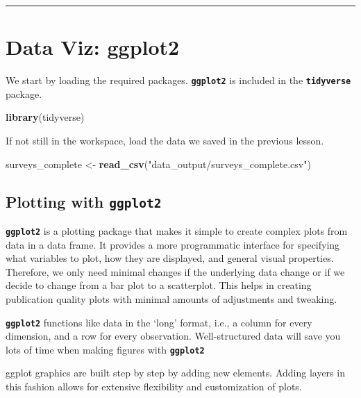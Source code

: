 \documentclass[]{book}
\newenvironment{Shaded}{\begin{snugshade}}{\end{snugshade}}
\newcommand{\KeywordTok}[1]{\textcolor[rgb]{0.13,0.29,0.53}{\textbf{#1}}}
\newcommand{\StringTok}[1]{\textcolor[rgb]{0.31,0.60,0.02}{#1}}
\newcommand{\NormalTok}[1]{#1}
\begin{document}
\begin{center}\rule{0.5\linewidth}{\linethickness}\end{center}

\chapter{Data Viz: ggplot2}\label{data-viz-ggplot2}

We start by loading the required packages. \textbf{\texttt{ggplot2}} is
included in the \textbf{\texttt{tidyverse}} package.

\begin{Shaded}
\begin{Highlighting}[]
\KeywordTok{library}\NormalTok{(tidyverse)}
\end{Highlighting}
\end{Shaded}

If not still in the workspace, load the data we saved in the previous
lesson.

\begin{Shaded}
\begin{Highlighting}[]
\NormalTok{surveys_complete <-}\StringTok{ }\KeywordTok{read_csv}\NormalTok{(}\StringTok{"data_output/surveys_complete.csv"}\NormalTok{)}
\end{Highlighting}
\end{Shaded}

\section{\texorpdfstring{Plotting with
\textbf{\texttt{ggplot2}}}{Plotting with ggplot2}}\label{plotting-with-ggplot2}

\textbf{\texttt{ggplot2}} is a plotting package that makes it simple to
create complex plots from data in a data frame. It provides a more
programmatic interface for specifying what variables to plot, how they
are displayed, and general visual properties. Therefore, we only need
minimal changes if the underlying data change or if we decide to change
from a bar plot to a scatterplot. This helps in creating publication
quality plots with minimal amounts of adjustments and tweaking.

\textbf{\texttt{ggplot2}} functions like data in the `long' format,
i.e., a column for every dimension, and a row for every observation.
Well-structured data will save you lots of time when making figures with
\textbf{\texttt{ggplot2}}

ggplot graphics are built step by step by adding new elements. Adding
layers in this fashion allows for extensive flexibility and
customization of plots.
\end{document}
